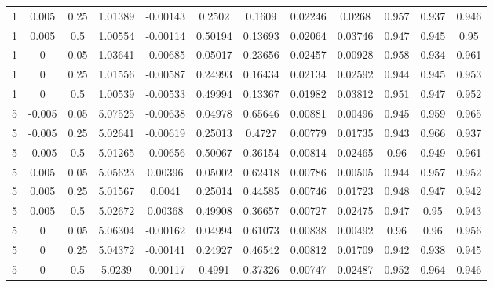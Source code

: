 \documentclass{article}
\begin{document}
\begin{landscape}
\begin{table}[htb]
\begin{tabular}{cccccccccccc}
1	&0.005	&0.25	&1.01389	&-0.00143	&0.2502	&0.1609	&0.02246	&0.0268	&0.957	&0.937	&0.946\\
1	&0.005	&0.5	&1.00554	&-0.00114	&0.50194	&0.13693	&0.02064	&0.03746	&0.947	&0.945	&0.95\\
1	&0	&0.05	&1.03641	&-0.00685	&0.05017	&0.23656	&0.02457	&0.00928	&0.958	&0.934	&0.961\\
1	&0	&0.25	&1.01556	&-0.00587	&0.24993	&0.16434	&0.02134	&0.02592	&0.944	&0.945	&0.953\\
1	&0	&0.5	&1.00539	&-0.00533	&0.49994	&0.13367	&0.01982	&0.03812	&0.951	&0.947	&0.952\\
5	&-0.005	&0.05	&5.07525	&-0.00638	&0.04978	&0.65646	&0.00881	&0.00496	&0.945	&0.959	&0.965\\
5	&-0.005	&0.25	&5.02641	&-0.00619	&0.25013	&0.4727	&0.00779	&0.01735	&0.943	&0.966	&0.937\\
5	&-0.005	&0.5	&5.01265	&-0.00656	&0.50067	&0.36154	&0.00814	&0.02465	&0.96	&0.949	&0.961\\
5	&0.005	&0.05	&5.05623	&0.00396	&0.05002	&0.62418	&0.00786	&0.00505	&0.944	&0.957	&0.952\\
5	&0.005	&0.25	&5.01567	&0.0041	&0.25014	&0.44585	&0.00746	&0.01723	&0.948	&0.947	&0.942\\
5	&0.005	&0.5	&5.02672	&0.00368	&0.49908	&0.36657	&0.00727	&0.02475	&0.947	&0.95	&0.943\\
5	&0	&0.05	&5.06304	&-0.00162	&0.04994	&0.61073	&0.00838	&0.00492	&0.96	&0.96	&0.956\\
5	&0	&0.25	&5.04372	&-0.00141	&0.24927	&0.46542	&0.00812	&0.01709	&0.942	&0.938	&0.945\\
5	&0	&0.5	&5.0239	&-0.00117	&0.4991	&0.37326	&0.00747	&0.02487	&0.952	&0.964	&0.946\\
  \hline
  \end{tabular}
  \label{tab:simexp}
\end{table}
\clearpage


\end{landscape}
\end{document}
